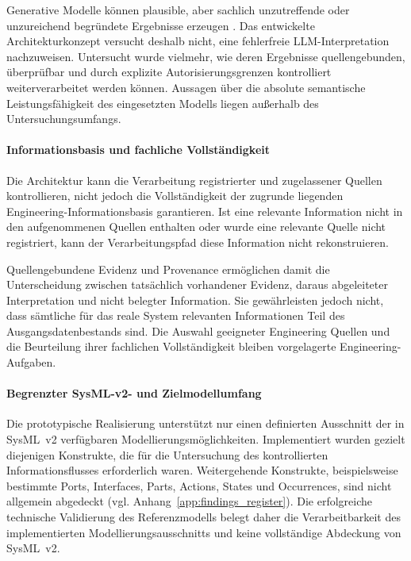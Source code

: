 Generative Modelle können plausible, aber sachlich unzutreffende oder
unzureichend begründete Ergebnisse erzeugen
\cite{Topcu2025,Barke2023,Sergeyuk2025}. Das entwickelte Architekturkonzept
versucht deshalb nicht, eine fehlerfreie LLM-Interpretation nachzuweisen.
Untersucht wurde vielmehr, wie deren Ergebnisse quellengebunden,
überprüfbar und durch explizite Autorisierungsgrenzen kontrolliert
weiterverarbeitet werden können. Aussagen über die absolute semantische
Leistungsfähigkeit des eingesetzten Modells liegen außerhalb des
Untersuchungsumfangs.

\paragraph{Informationsbasis und fachliche Vollständigkeit}

Die Architektur kann die Verarbeitung registrierter und zugelassener Quellen
kontrollieren, nicht jedoch die Vollständigkeit der zugrunde liegenden
Engineering-Informationsbasis garantieren. Ist eine relevante Information
nicht in den aufgenommenen Quellen enthalten oder wurde eine relevante
Quelle nicht registriert, kann der Verarbeitungspfad diese Information nicht
rekonstruieren.

Quellengebundene Evidenz und Provenance ermöglichen damit die
Unterscheidung zwischen tatsächlich vorhandener Evidenz, daraus
abgeleiteter Interpretation und nicht belegter Information. Sie gewährleisten
jedoch nicht, dass sämtliche für das reale System relevanten Informationen
Teil des Ausgangsdatenbestands sind. Die Auswahl geeigneter Engineering
Quellen und die Beurteilung ihrer fachlichen Vollständigkeit bleiben
vorgelagerte Engineering-Aufgaben.

\paragraph{Begrenzter SysML-v2- und Zielmodellumfang}

Die prototypische Realisierung unterstützt nur einen definierten Ausschnitt
der in SysML~v2 verfügbaren Modellierungsmöglichkeiten. Implementiert wurden
gezielt diejenigen Konstrukte, die für die Untersuchung des kontrollierten
Informationsflusses erforderlich waren. Weitergehende Konstrukte,
beispielsweise bestimmte Ports, Interfaces, Parts, Actions, States und
Occurrences, sind nicht allgemein abgedeckt
(vgl. Anhang~\ref{app:findings_register}). Die erfolgreiche technische
Validierung des Referenzmodells belegt daher die Verarbeitbarkeit des
implementierten Modellierungsausschnitts und keine vollständige Abdeckung von
SysML~v2.

